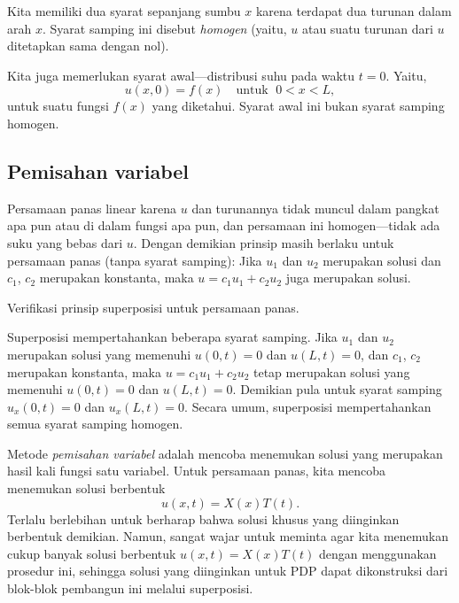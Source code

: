Kita memiliki dua syarat sepanjang sumbu $x$ karena terdapat
dua turunan dalam arah $x$.
Syarat samping ini disebut
\emph{homogen}
(yaitu, $u$ atau suatu turunan dari $u$ ditetapkan sama dengan nol).

Kita juga memerlukan syarat awal---distribusi suhu
pada waktu $t=0$.  Yaitu,
\begin{equation*}
u(x,0) = f(x)
\quad \text{untuk } \; 0 < x < L ,
\end{equation*}
untuk suatu fungsi $f(x)$ yang diketahui.
Syarat awal ini bukan syarat samping homogen.

\subsection{Pemisahan variabel}

Persamaan panas linear karena $u$ dan turunannya tidak
muncul dalam pangkat apa pun atau di dalam fungsi apa pun,
dan persamaan ini homogen---tidak ada suku yang bebas dari $u$.
Dengan demikian prinsip  masih berlaku untuk
persamaan panas
(tanpa syarat samping):
Jika $u_1$ dan $u_2$ merupakan
solusi dan $c_1$, $c_2$ merupakan konstanta, maka
$u = c_1 u_1 + c_2 u_2$ juga merupakan solusi.

\begin{exercise}
Verifikasi prinsip superposisi untuk persamaan panas.
\end{exercise}

Superposisi mempertahankan beberapa syarat samping.
Jika $u_1$ dan $u_2$ merupakan
solusi yang memenuhi $u(0,t) = 0$ dan $u(L,t) = 0$,
dan $c_1$, $c_2$ merupakan konstanta, maka
$u = c_1 u_1 + c_2 u_2$ tetap merupakan solusi
yang memenuhi $u(0,t) = 0$ dan $u(L,t) = 0$.  Demikian pula
untuk syarat samping $u_x(0,t) = 0$ dan $u_x(L,t) = 0$.  Secara umum,
superposisi mempertahankan semua syarat samping homogen.

Metode
\emph{pemisahan variabel} adalah
mencoba menemukan solusi yang merupakan hasil kali fungsi satu variabel.
Untuk persamaan panas, kita mencoba menemukan solusi berbentuk
\begin{equation*}
u(x,t) = X(x)T(t) .
\end{equation*}
Terlalu berlebihan untuk berharap bahwa solusi khusus yang diinginkan berbentuk demikian.
Namun, sangat wajar untuk meminta agar kita menemukan
cukup banyak solusi  berbentuk
$u(x,t) = X(x)T(t)$ dengan menggunakan prosedur ini,
sehingga solusi yang diinginkan untuk PDP dapat dikonstruksi dari
blok-blok pembangun ini melalui superposisi.

